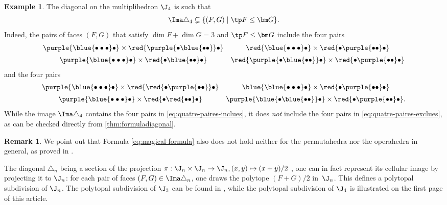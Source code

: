 \documentclass[JEP,XML,SOM,NoFloatCountersInSection,Unicode,published]{cedram}
\def\mto{\mathchoice{\longmapsto}{\mapsto}{\mapsto}{\mapsto}}
\theoremstyle{definition}
\newtheorem{example}[definition]{\sc Example}
\newtheorem{remark}[definition]{\sc Remark}
\theoremstyle{plain}
\begin{document}
\begin{example} \label{prop:pas-top-bot}
The diagonal on the multiplihedron $\J_4$ is such that
\[
\Ima \triangle_4 \subsetneq \{ (F,G)\mid \tp F\leq \bm G \}.
\]
Indeed, the pairs of faces $(F,G)$ that satisfy $\dim F + \dim G = 3$ and $\tp F\leq \bm G$ include the four pairs
\begin{equation} \label{eq:quatre-paires-inclues}
\begin{matrix}
\purple{\blue{\bullet \bullet \bullet}\bullet} \times \red{\purple{\bullet\blue{\bullet\bullet}}\bullet} &
\red{\blue{\bullet\bullet\bullet}\bullet} \times \red{\bullet\purple{\bullet\bullet}\bullet} \\[5pt]
\purple{\blue{\bullet\bullet\bullet}\bullet} \times \red{\bullet\blue{\bullet\bullet}\bullet} &
\red{\purple{\bullet\blue{\bullet\bullet}}\bullet} \times \red{\bullet\purple{\bullet\bullet}\bullet}
\end{matrix}
\end{equation}
and the four pairs
\begin{equation} \label{eq:quatre-paires-exclues}
\begin{matrix}
\purple{\blue{\bullet \bullet \bullet}\bullet} \times \red{\red{\bullet\purple{\bullet\bullet}}\bullet} &
\blue{\blue{\bullet\bullet\bullet}\bullet} \times \red{\bullet\purple{\bullet\bullet}\bullet} \\[5pt]
\purple{\blue{\bullet\bullet\bullet}\bullet} \times \red{\bullet\red{\bullet\bullet}\bullet} &
\purple{\blue{\bullet\blue{\bullet\bullet}}\bullet} \times \red{\bullet\purple{\bullet\bullet}\bullet}.
\end{matrix}
\end{equation}
While the image $\Ima \triangle_4$ contains the four pairs in \eqref{eq:quatre-paires-inclues}, it does \emph{not} include the four pairs in \eqref{eq:quatre-paires-exclues}, as can be checked directly from \cref{thm:formuladiagonal}.
\end{example}

\begin{remark}
We point out that Formula \eqref{eq:magical-formula} also does not hold neither for the permutahedra nor the operahedra in general, as proved in \cite[\S 3.2]{LA21}.
\end{remark}

The diagonal $\triangle_n$ being a section of the projection $\pi : \J_n \times \J_n \to \J_n, (x,y) \mto (x+y)/2$ \cite[Prop.\,1.1]{LA21}, one can in fact represent its cellular image by projecting it to $\J_n$: for each pair of faces $(F,G) \in \Ima \triangle_n$, one draws the polytope $(F+G)/2$ in~$\J_n$. This defines a polytopal subdivision of $\J_n$. The polytopal subdivision of $\J_3$ can be found in \cite[Fig.\,3]{LA21}, while the polytopal subdivision of $\J_4$ is illustrated on the first page of this article.
\end{document}
